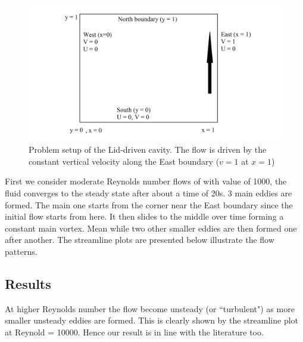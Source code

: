 \begin{figure}[H]
	\centering
	\includegraphics[width=5.5in]{figures/Lid_driven_set_up.png}
	\caption{Problem setup of the Lid-driven cavity. The flow is driven by the constant vertical velocity along the East boundary ($v=1$ at $x=1$)  }	
\label{fig:6.16}
\end{figure}
First we consider moderate Reynolds number flows of with value of 1000, the fluid converges to the steady state after about a time of 20s. 3 main eddies are formed. The main one starts from the corner near the East boundary since the initial flow starts from here. It then slides to the middle over time forming a constant main vortex. Mean while two other smaller eddies are then formed one after another. The streamline plots are presented below illustrate the flow patterns.\\

\subsection{Results}
At higher Reynolds number the flow become unsteady (or ``turbulent") as more smaller unsteady eddies are formed. This is clearly shown by the streamline plot at Reynold = 10000. Hence our result is in line with the literature too.\\

